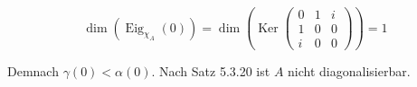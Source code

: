 \documentclass[a4paper,12pt]{article}
\begin{document}
\begin{enumerate}[label=\alph*)]
    \[
        \dim(\operatorname{Eig}_{\chi_A}(0)) = \dim\left(\operatorname{Ker}\begin{pmatrix}
            0 & 1 & i \\
            1 & 0 & 0 \\
            i & 0 & 0
          \end{pmatrix}\right) = 1
    \]

    Demnach $\gamma(0) < \alpha(0)$. Nach Satz 5.3.20 ist $A$ nicht diagonalisierbar.

\end{enumerate}
\end{document}
